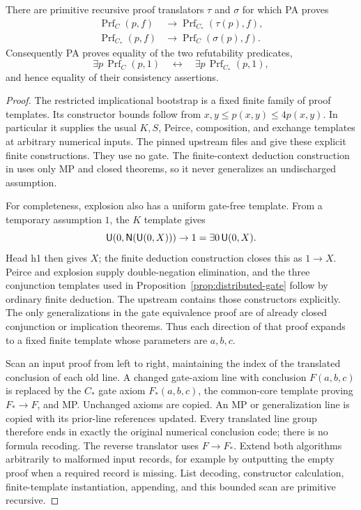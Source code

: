 \begin{theorem}
\label{thm:distributed-pa-translation}
There are primitive recursive proof translators $\tau$ and $\sigma$
for which PA proves
\begin{align*}
 \operatorname{Prf}_C(p,f)&\longrightarrow
   \operatorname{Prf}_{C_*}(\tau(p),f),\\
 \operatorname{Prf}_{C_*}(p,f)&\longrightarrow
   \operatorname{Prf}_{C}(\sigma(p),f).
\end{align*}
Consequently PA proves equality of the two refutability predicates,
\[
 \exists p\,\operatorname{Prf}_C(p,1)
 \quad\longleftrightarrow\quad
 \exists p\,\operatorname{Prf}_{C_*}(p,1),
\]
and hence equality of their consistency assertions.
\end{theorem}
\begin{proof}
The restricted implicational bootstrap is a fixed finite family of
proof templates. Its constructor bounds follow from
$x,y\leq p(x,y)\leq4p(x,y)$. In particular it supplies the usual
$K,S$, Peirce, composition, and exchange templates at arbitrary
numerical inputs. The pinned upstream files
 and
 give these explicit finite
constructions. They use no gate. The finite-context deduction
construction in  uses only MP and
closed theorems, so it never generalizes an undischarged assumption.

For completeness, explosion also has a uniform gate-free template.
From a temporary assumption $1$, the $K$ template gives
\[
 \mathsf U(0,\mathsf N(\mathsf U(0,X)))\to1
       =\exists 0\,\mathsf U(0,X).
\]
Head h1 then gives $X$; the finite deduction construction closes this
as $1\to X$. Peirce and explosion supply double-negation elimination,
and the three conjunction templates used in
Proposition~\ref{prop:distributed-gate} follow by ordinary finite
deduction. The upstream  contains
those constructors explicitly. The only generalizations in the gate
equivalence proof are of already closed conjunction or implication
theorems. Thus each direction of that proof expands to a fixed finite
template whose parameters are $a,b,c$.

Scan an input proof from left to right, maintaining the index of the
translated conclusion of each old line. A changed gate-axiom line
with conclusion $F(a,b,c)$ is replaced by the $C_*$ gate axiom
$F_*(a,b,c)$, the common-core template proving $F_*\to F$, and MP.
Unchanged axioms are copied. An MP or generalization line is copied
with its prior-line references updated. Every translated line group
therefore ends in exactly the original numerical conclusion code;
there is no formula recoding. The reverse translator uses $F\to F_*$.
Extend both algorithms arbitrarily to malformed input records, for
example by outputting the empty proof when a required record is
missing. List decoding, constructor calculation, finite-template
instantiation, appending, and this bounded scan are primitive
recursive.


\end{proof}
